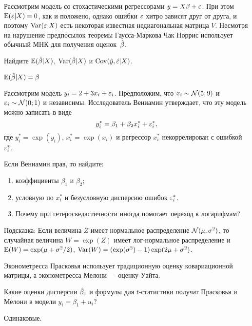 \begin{problem}
Рассмотрим модель со стохастическими регрессорами $y=X\beta + \varepsilon$. При этом $\mathbb{E}(\varepsilon|X)=0$, как и положено, однако ошибки $\varepsilon$ хитро зависят друг от друга, и поэтому $\operatorname{Var}(\varepsilon|X)$ есть некоторая известная недиагональная матрица $V$. Несмотря на нарушение предпосылок теоремы Гаусса-Маркова Чак Норрис использует обычный МНК для получения оценок~$\hat{\beta}$.

Найдите $\mathbb{E}(\hat{\beta}|X)$, $\operatorname{Var}(\hat{\beta}|X)$ и $\operatorname{Cov}(\hat{y}, \hat{\varepsilon} | X)$.
\begin{sol}
$\mathbb{E}(\hat{\beta}|X)=\beta$
\end{sol}
\end{problem}





\begin{problem}
Рассмотрим модель $y_i = 2 + 3x_i + \varepsilon_i$. Предположим, что $x_i \sim \mathcal{N}(5;9)$ и $\varepsilon_i \sim \mathcal{N}(0;1)$ и независимы. Исследователь Вениамин утверждает, что эту модель можно записать в виде
\[
y_i^* = \beta_1 + \beta_2 x_i^* + \varepsilon_i^*,
\]
где $y_i^*=\exp(y_i)$, $x_i^*=\exp(x_i)$ и регрессор $x_i^*$ некоррелирован с ошибкой $\varepsilon_i^*$.

Если Вениамин прав, то найдите:

\begin{enumerate}
\item коэффициенты $\beta_1$ и $\beta_2$;
\item условную по $x_i^*$ и безусловную дисперсию ошибок $\varepsilon_i^*$.
\item Почему при гетероскедастичности иногда помогает переход к логарифмам?
\end{enumerate}

Подсказка: Если величина $Z$ имеет нормальное распределение $\mathcal{N}(\mu, \sigma^2)$, то случайная величина $W=\exp(Z)$ имеет лог-нормальное распределение и $\mathbb{E}(W)=\exp(\mu + \sigma^2/2)$, $\operatorname{Var}(W)=(\exp(\sigma^2)-1)\exp(2\mu+\sigma^2)$.


\begin{sol}

\end{sol}
\end{problem}




\begin{problem}
Эконометресса Прасковья использует традиционную оценку ковариационной матрицы, а эконометресса Мелони — оценку Уайта.

Какие оценки дисперсии $\hat{\beta}_1$ и формулы для $t$-статистики получат Прасковья и Мелони в модели $y_i = \beta_1 + u_i$?
\begin{sol}
Одинаковые.
\end{sol}
\end{problem}

